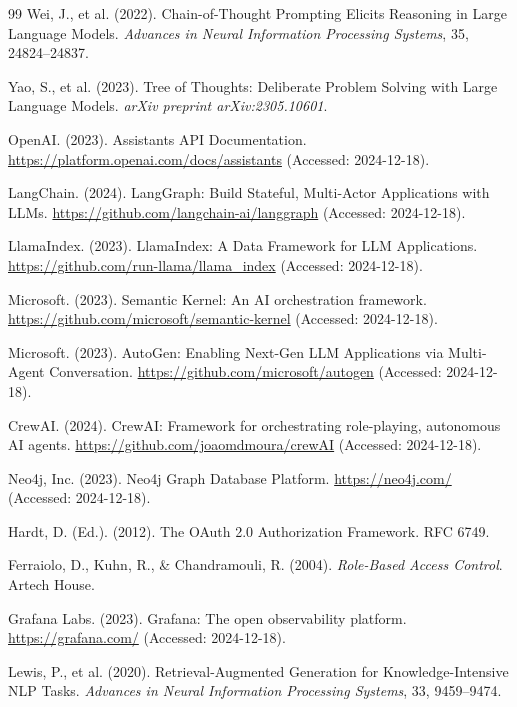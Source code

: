 \documentclass[a4paper,twoside]{sapthesis}
\begin{document}
\begin{thebibliography}{99}
Wei, J., et al. (2022). Chain-of-Thought Prompting Elicits Reasoning in Large Language Models. \textit{Advances in Neural Information Processing Systems}, 35, 24824--24837.

Yao, S., et al. (2023). Tree of Thoughts: Deliberate Problem Solving with Large Language Models. \textit{arXiv preprint arXiv:2305.10601}.

OpenAI. (2023). Assistants API Documentation. \url{https://platform.openai.com/docs/assistants} (Accessed: 2024-12-18).

LangChain. (2024). LangGraph: Build Stateful, Multi-Actor Applications with LLMs. \url{https://github.com/langchain-ai/langgraph} (Accessed: 2024-12-18).

LlamaIndex. (2023). LlamaIndex: A Data Framework for LLM Applications. \url{https://github.com/run-llama/llama_index} (Accessed: 2024-12-18).

Microsoft. (2023). Semantic Kernel: An AI orchestration framework. \url{https://github.com/microsoft/semantic-kernel} (Accessed: 2024-12-18).

Microsoft. (2023). AutoGen: Enabling Next-Gen LLM Applications via Multi-Agent Conversation. \url{https://github.com/microsoft/autogen} (Accessed: 2024-12-18).

CrewAI. (2024). CrewAI: Framework for orchestrating role-playing, autonomous AI agents. \url{https://github.com/joaomdmoura/crewAI} (Accessed: 2024-12-18).

Neo4j, Inc. (2023). Neo4j Graph Database Platform. \url{https://neo4j.com/} (Accessed: 2024-12-18).

Hardt, D. (Ed.). (2012). The OAuth 2.0 Authorization Framework. RFC 6749.

Ferraiolo, D., Kuhn, R., \& Chandramouli, R. (2004). \textit{Role-Based Access Control}. Artech House.

Grafana Labs. (2023). Grafana: The open observability platform. \url{https://grafana.com/} (Accessed: 2024-12-18).

Lewis, P., et al. (2020). Retrieval-Augmented Generation for Knowledge-Intensive NLP Tasks. \textit{Advances in Neural Information Processing Systems}, 33, 9459--9474.

\end{thebibliography}
\end{document}
